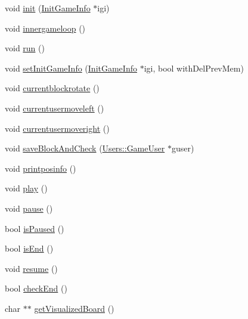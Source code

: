 \begin{DoxyCompactItemize}
void \hyperlink{class_tetris_1_1_game_controller_a9c0f88f11b8b75063e63bcbc621dc0be}{init} (\hyperlink{class_tetris_1_1_init_game_info}{Init\+Game\+Info} $\ast$igi)
\item 
void \hyperlink{class_tetris_1_1_game_controller_a9dd5159934835ef54cb3c0b24cbc1fd6}{innergameloop} ()
\item 
void \hyperlink{class_tetris_1_1_game_controller_a49446695e3ba0ff829f20beaeecac6da}{run} ()
\item 
void \hyperlink{class_tetris_1_1_game_controller_a0d835f535b48529ca536115dd8123099}{set\+Init\+Game\+Info} (\hyperlink{class_tetris_1_1_init_game_info}{Init\+Game\+Info} $\ast$igi, bool with\+Del\+Prev\+Mem)
\item 
void \hyperlink{class_tetris_1_1_game_controller_a5d93facb945f87ba33fb8be74df023fa}{currentblockrotate} ()
\item 
void \hyperlink{class_tetris_1_1_game_controller_ac0d40a0936505754131099034b4271fa}{currentusermoveleft} ()
\item 
void \hyperlink{class_tetris_1_1_game_controller_a1d2859507cbc9bf9789753228cdedc1f}{currentusermoveright} ()
\item 
void \hyperlink{class_tetris_1_1_game_controller_a3c63a9754e4cbeae4f66a5760bb4055d}{save\+Block\+And\+Check} (\hyperlink{class_tetris_1_1_users_1_1_game_user}{Users\+::\+Game\+User} $\ast$guser)
\item 
void \hyperlink{class_tetris_1_1_game_controller_a269da7d33475ae2f327ee9a51f02ef52}{printposinfo} ()
\item 
void \hyperlink{class_tetris_1_1_game_controller_a766a7537d955c62969f2e4b7c0b3c73d}{play} ()
\item 
void \hyperlink{class_tetris_1_1_game_controller_a1f55b577248e34b4e0902ce114610edd}{pause} ()
\item 
bool \hyperlink{class_tetris_1_1_game_controller_a18e513f45750361e14af091704e9f1d4}{is\+Paused} ()
\item 
bool \hyperlink{class_tetris_1_1_game_controller_a0fa9ec1dd636ecc916cd4460e14781c4}{is\+End} ()
\item 
void \hyperlink{class_tetris_1_1_game_controller_ab9ff093ea91e3d248a8a287289e758b0}{resume} ()
\item 
bool \hyperlink{class_tetris_1_1_game_controller_ac8058c827eaa393194dcfb83c6964f8a}{check\+End} ()
\item 
char $\ast$$\ast$ \hyperlink{class_tetris_1_1_game_controller_a78b39bdb39707e119d6e708bdb2aca17}{get\+Visualized\+Board} ()
\item 
$$
\end{DoxyCompactItemize}
